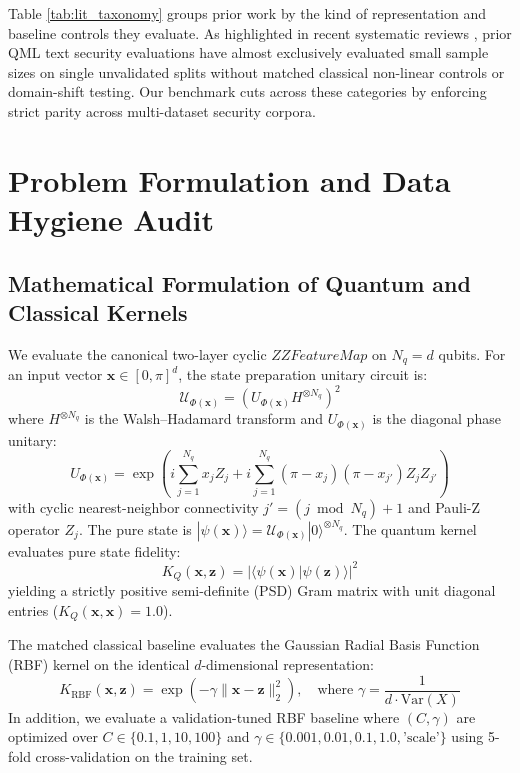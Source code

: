 \documentclass{article}
\begin{document}
Table \ref{tab:lit_taxonomy} groups prior work by the kind of representation and baseline controls they evaluate. As highlighted in recent systematic reviews \cite{ammar2026quantum,li2026large}, prior QML text security evaluations have almost exclusively evaluated small sample sizes on single unvalidated splits without matched classical non-linear controls or domain-shift testing. Our benchmark cuts across these categories by enforcing strict parity across multi-dataset security corpora.

\section{Problem Formulation and Data Hygiene Audit}
\label{sec:problem}

\subsection{Mathematical Formulation of Quantum and Classical Kernels}
We evaluate the canonical two-layer cyclic $ZZFeatureMap$ on $N_q = d$ qubits. For an input vector $\mathbf{x} \in [0, \pi]^d$, the state preparation unitary circuit is:
\begin{equation}
    \mathcal{U}_{\Phi(\mathbf{x})} = \left( U_{\Phi(\mathbf{x})} H^{\otimes N_q} \right)^2
\end{equation}
where $H^{\otimes N_q}$ is the Walsh–Hadamard transform and $U_{\Phi(\mathbf{x})}$ is the diagonal phase unitary:
\begin{equation}
    U_{\Phi(\mathbf{x})} = \exp\left( i \sum_{j=1}^{N_q} x_j Z_j + i \sum_{j=1}^{N_q} (\pi - x_j)(\pi - x_{j'}) Z_j Z_{j'} \right)
\end{equation}
with cyclic nearest-neighbor connectivity $j' = (j \bmod N_q) + 1$ and Pauli-Z operator $Z_j$. The pure state is $|\psi(\mathbf{x})\rangle = \mathcal{U}_{\Phi(\mathbf{x})}|0\rangle^{\otimes N_q}$. The quantum kernel evaluates pure state fidelity:
\begin{equation}
    K_Q(\mathbf{x}, \mathbf{z}) = |\langle\psi(\mathbf{x})|\psi(\mathbf{z})\rangle|^2
\end{equation}
yielding a strictly positive semi-definite (PSD) Gram matrix with unit diagonal entries ($K_Q(\mathbf{x}, \mathbf{x}) = 1.0$).

The matched classical baseline evaluates the Gaussian Radial Basis Function (RBF) kernel on the identical $d$-dimensional representation:
\begin{equation}
    K_{\text{RBF}}(\mathbf{x}, \mathbf{z}) = \exp\left( -\gamma \|\mathbf{x} - \mathbf{z}\|_2^2 \right), \quad \text{where } \gamma = \frac{1}{d \cdot \text{Var}(X)}
\end{equation}
In addition, we evaluate a validation-tuned RBF baseline where $(C, \gamma)$ are optimized over $C \in \{0.1, 1, 10, 100\}$ and $\gamma \in \{0.001, 0.01, 0.1, 1.0, \text{'scale'}\}$ using 5-fold cross-validation on the training set.
\end{document}
